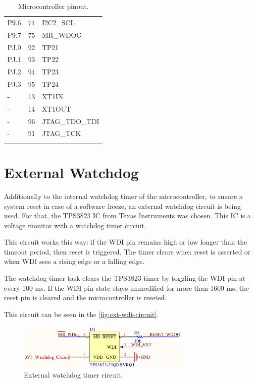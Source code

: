\begin{longtable}{lcl}
    P9.6              & 74                  & I2C2\_SCL             \\
    P9.7              & 75                  & MR\_WDOG              \\
    \midrule
    PJ.0              & 92                  & TP21                  \\
    PJ.1              & 93                  & TP22                  \\
    PJ.2              & 94                  & TP23                  \\
    PJ.3              & 95                  & TP24                  \\
    \midrule
    -                 & 13                  & XT1IN                 \\
    -                 & 14                  & XT1OUT                \\
    -                 & 96                  & JTAG\_TDO\_TDI        \\
    -                 & 91                  & JTAG\_TCK             \\
    \bottomrule[1.5pt]
    \caption{Microcontroller pinout.}
    \label{tab:mcu-pinout}
\end{longtable}

\section{External Watchdog}

Additionally to the internal watchdog timer of the microcontroller, to ensure a system reset in case of a software freeze, an external watchdog circuit is being used. For that, the TPS3823 IC from Texas Instruments was chosen. This IC is a voltage monitor with a watchdog timer circuit.

This circuit works this way: if the WDI pin remains high or low longer than the timeout period, then reset is triggered. The timer clears when reset is asserted or when WDI sees a rising edge or a falling edge.

The watchdog timer task clears the TPS3823 timer by toggling the WDI pin at every 100 ms. If the WDI pin state stays unmodified for more than 1600 ms, the reset pin is cleared and the microcontroller is reseted.

This circuit can be seen in the \autoref{fig:ext-wdt-circuit}.

\begin{figure}[!ht]
    \begin{center}
        \includegraphics[width=0.75\textwidth]{figures/ext-watchdog-circuit.png}
        \caption{External watchdog timer circuit.}
        \label{fig:ext-wdt-circuit}
    \end{center}
\end{figure}


